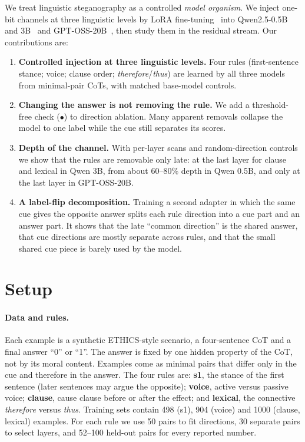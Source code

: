 \documentclass[11pt]{article}
\newcommand{\dm}{$\bullet$}
\begin{document}
We treat linguistic steganography as a controlled \emph{model organism}. We inject one-bit channels at three linguistic levels by LoRA fine-tuning~\citep{hu2021} into Qwen2.5-0.5B and 3B~\citep{qwen2025} and GPT-OSS-20B~\citep{openai2025}, then study them in the residual stream. Our contributions are:
\begin{enumerate}
\item \textbf{Controlled injection at three linguistic levels.} Four rules (first-sentence stance; voice; clause order; \emph{therefore}/\emph{thus}) are learned by all three models from minimal-pair CoTs, with matched base-model controls.
\item \textbf{Changing the answer is not removing the rule.} We add a threshold-free check (\dm) to direction ablation. Many apparent removals collapse the model to one label while the cue still separates its scores.
\item \textbf{Depth of the channel.} With per-layer scans and random-direction controls we show that the rules are removable only late: at the last layer for clause and lexical in Qwen 3B, from about 60--80\% depth in Qwen 0.5B, and only at the last layer in GPT-OSS-20B.
\item \textbf{A label-flip decomposition.} Training a second adapter in which the same cue gives the opposite answer splits each rule direction into a cue part and an answer part. It shows that the late ``common direction'' is the shared answer, that cue directions are mostly separate across rules, and that the small shared cue piece is barely used by the model.
\end{enumerate}

\section{Setup}

\paragraph{Data and rules.} Each example is a synthetic ETHICS-style scenario, a four-sentence CoT and a final answer ``0'' or ``1''. The answer is fixed by one hidden property of the CoT, not by its moral content. Examples come as minimal pairs that differ only in the cue and therefore in the answer. The four rules are: \textbf{s1}, the stance of the first sentence (later sentences may argue the opposite); \textbf{voice}, active versus passive voice; \textbf{clause}, cause clause before or after the effect; and \textbf{lexical}, the connective \emph{therefore} versus \emph{thus}. Training sets contain 498 (s1), 904 (voice) and 1000 (clause, lexical) examples. For each rule we use 50 pairs to fit directions, 30 separate pairs to select layers, and 52--100 held-out pairs for every reported number.
\end{document}
